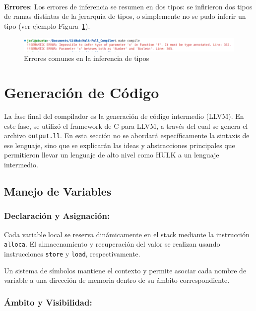 \documentclass{llncs}
\begin{document}
\  

\textbf{Errores}: Los errores de inferencia se resumen en dos tipos: se infirieron dos tipos de ramas distintas de la jerarquía de tipos, o simplemente no se pudo inferir un tipo (ver ejemplo Figura~\ref{fig:errores_6}).
\begin{figure}[h]
\centering
\includegraphics[width=1\textwidth]{images/inference_errors.png}
\caption{Errores comunes en la inferencia de tipos}
\label{fig:errores_6}
\end{figure}

\vspace{10pt}
\section{Generación de Código}

La fase final del compilador es la generación de código intermedio (LLVM). En este fase, se utilizó el framework de C para LLVM, a través del cual se genera el archivo \texttt{output.ll}. En esta sección no se abordará específicamente la sintaxis de ese lenguaje, sino que se explicarán las ideas y abstracciones principales que permitieron llevar 
un lenguaje de alto nivel como HULK a un lenguaje intermedio. 

\subsection{Manejo de Variables}

\subsubsection{Declaración y Asignación:}

Cada variable local se reserva dinámicamente en el stack mediante la instrucción \texttt{alloca}. El almacenamiento y recuperación del valor se realizan usando instrucciones \texttt{store} y \texttt{load}, respectivamente.

Un sistema de símbolos mantiene el contexto y permite asociar cada nombre de variable a una dirección de memoria dentro de su ámbito correspondiente.

\subsubsection{Ámbito y Visibilidad:}
\end{document}
